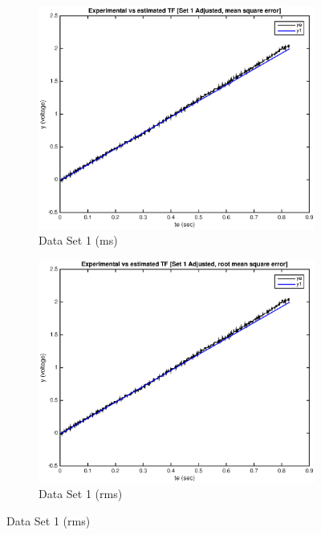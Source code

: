 \documentclass[11pt,a4paper]{article}
\begin{document}
\begin{enumerate}
\begin{figure}[H]
  \begin{subfigure}{0.5\textwidth}
  \includegraphics[width=0.9\linewidth]{Matlab_Figures/y2_dataset1_ms.eps} 
  \caption{Data Set 1 (ms)}
  \label{fig:subim1}
  \end{subfigure}
  \begin{subfigure}{0.5\textwidth}
  \includegraphics[width=0.9\linewidth]{Matlab_Figures/y2_dataset1_rms.eps}
  \caption{Data Set 1 (rms)}
  \label{fig:subim2}
  \end{subfigure}
  

\end{figure}
\end{enumerate}
\end{document}
